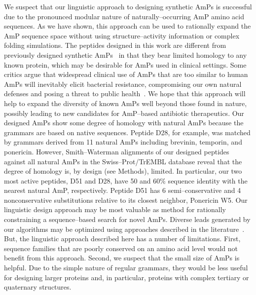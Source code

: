     We suspect that our linguistic approach to
    designing synthetic AmPs is successful due to the
    pronounced modular nature of naturally--occurring
    AmP amino acid sequences. As we have shown, this
    approach can be used to rationally expand the AmP
    sequence space without using structure--activity
    information or complex folding simulations. The
    peptides designed in this work are different from
    previously designed synthetic AmPs~\cite{tossi2000amphipathic,tiozzo1998wide} in that
    they bear limited homology to any known protein,
    which may be desirable for AmPs used in clinical
    settings. Some critics argue that widespread
    clinical use of AmPs that are too similar to human
    AmPs will inevitably elicit bacterial resistance,
    compromising our own natural defenses and posing
    a threat to public health~\cite{bell2003arming}. We hope
that this approach will help to expand the diversity of known AmPs
well beyond those found in nature, possibly leading to new
candidates for AmP--based antibiotic therapeutics.  Our designed
AmPs show some degree of homology with natural AmPs  because the
grammars are based on native sequences.  Peptide D28, for example,
was matched by grammars derived from 11 natural AmPs including
brevinin, temporin, and ponericin.  However, Smith--Waterman
alignments of our designed peptides against all natural AmPs in the
Swiss--Prot/TrEMBL database reveal that the degree of homology is,
by design (see Methods), limited.  In particular, our two most
active peptides, D51 and D28, have 50 and 60\% sequence identity
with the nearest natural AmP, respectively.  Peptide D51 has 6
semi--conservative and 4 nonconservative substitutions relative to
its closest neighbor, Ponericin W5.  Our linguistic design approach
may be most valuable as method for rationally constraining a
sequence--based search for novel AmPs. Diverse leads generated by
our algorithms may be optimized using approaches described in the
literature~\cite{hilpert2005high-throughput}. But, the linguistic
approach described here has a number of limitations. First, sequence
families that are poorly conserved on an amino acid level would not
benefit from this approach. Second, we suspect that the small size
of AmPs is helpful. Due to the simple nature of regular grammars,
they would be less useful for designing larger proteins and, in
particular, proteins with complex tertiary or quaternary structures.

